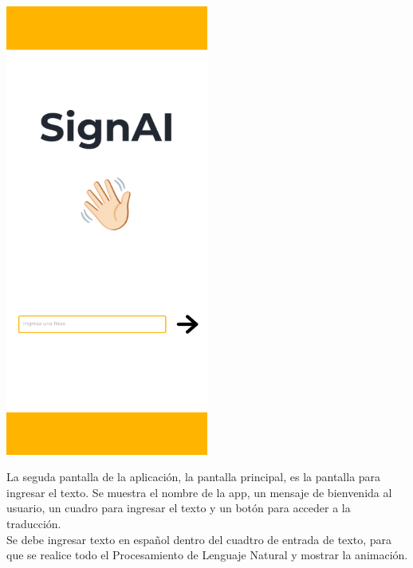 \begin{center}
    \includegraphics[width=0.5\textwidth]{Images/Cap 3/Pantalla2.png}
\end{center}
 
La seguda pantalla de la aplicación, la pantalla principal, es la pantalla para ingresar el texto. Se muestra el nombre de la app, un mensaje de bienvenida al usuario, un cuadro para ingresar el texto y un botón para acceder a la traducción.\\

Se debe ingresar texto en español dentro del cuadtro de entrada de texto, para que se realice todo el Procesamiento de Lenguaje Natural y mostrar la animación.

